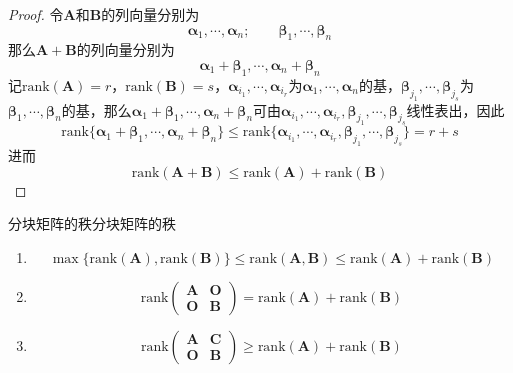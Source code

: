 \documentclass[lang = cn, scheme = chinese, thmcnt = section]{elegantbook}
\newcommand{\bs}{\boldsymbol}          %
\newcommand{\rank}{\text{rank}}        %
\begin{document}
\begin{proof}
	令$\bs{A}$和$\bs{B}$的列向量分别为
	$$
	\bs{\alpha}_1,\cdots,\bs{\alpha}_n;\qquad 
	\bs{\beta}_1,\cdots,\bs{\beta}_n
	$$
	那么$\bs{A}+\bs{B}$的列向量分别为
	$$
	\bs{\alpha}_1+\bs{\beta}_1,\cdots,\bs{\alpha}_n+\bs{\beta}_n
	$$
	记$\rank(\bs{A})=r$，$\rank(\bs{B})=s$，$\bs{\alpha}_{i_1},\cdots,\bs{\alpha}_{i_r}$为$\bs{\alpha}_1,\cdots,\bs{\alpha}_n$的基，$\bs{\beta}_{j_1},\cdots,\bs{\beta}_{j_s}$为$\bs{\beta}_1,\cdots,\bs{\beta}_n$的基，那么$\bs{\alpha}_1+\bs{\beta}_1,\cdots,\bs{\alpha}_n+\bs{\beta}_n$可由$\bs{\alpha}_{i_1},\cdots,\bs{\alpha}_{i_r},\bs{\beta}_{j_1},\cdots,\bs{\beta}_{j_s}$线性表出，因此%
	$$
	\rank\{ \bs{\alpha}_1+\bs{\beta}_1,\cdots,\bs{\alpha}_n+\bs{\beta}_n \}
	\le\rank\{ \bs{\alpha}_{i_1},\cdots,\bs{\alpha}_{i_r},\bs{\beta}_{j_1},\cdots,\bs{\beta}_{j_s} \}
	=r+s
	$$
	进而
	$$
	\rank(\bs{A}+\bs{B})\le\rank(\bs{A})+\rank(\bs{B})
	$$
\end{proof}

\begin{proposition}{分块矩阵的秩}{分块矩阵的秩}
	\begin{enumerate}
		\item 
		$$
		\max\{ \rank(\bs{A}),\rank(\bs{B}) \}
		\le \rank(\bs{A} , \bs{B})
		\le \rank(\bs{A})+\rank(\bs{B})
		$$
		\item 
		$$
		\rank\begin{pmatrix}
			\bs{A} & \bs{O}\\
			\bs{O} & \bs{B}
		\end{pmatrix}
		= \rank(\bs{A})+\rank(\bs{B})
		$$
		\item 
		$$
		\rank\begin{pmatrix}
			\bs{A} & \bs{C}\\
			\bs{O} & \bs{B}
		\end{pmatrix}
		\ge \rank(\bs{A})+\rank(\bs{B})
		$$
	\end{enumerate}
\end{proposition}
\end{document}
